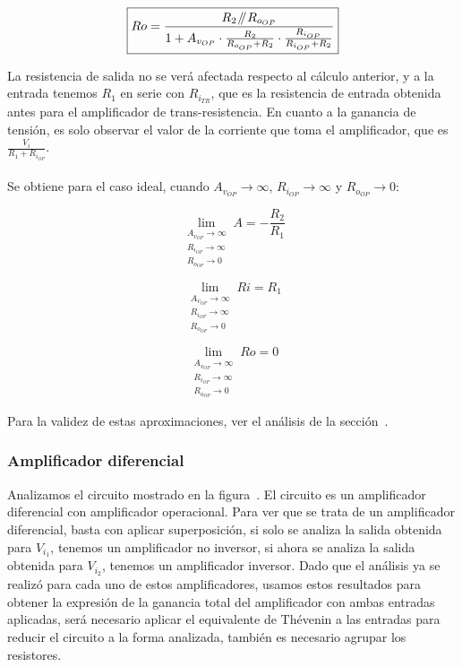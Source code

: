 \begin{equation}
\boxed{ R{o} = \frac{ R_{2} \mathbin{\!/\mkern-5mu/\!} R_{o_{OP}}  }{ 1 + A_{v_{OP}} \cdot \frac{R_{2}}{R_{o_{OP}} + R_{2}} \cdot \frac{R_{i_{OP}}}{R_{i_{OP}} + R_{2}}  }  }
\end{equation}

La resistencia de salida no se verá afectada respecto al cálculo anterior, y a la entrada tenemos $R_{1}$ en serie con $R_{i_{TR}}$, que es la resistencia de entrada obtenida antes para el amplificador de trans-resistencia. En cuanto a la ganancia de tensión, es solo observar el valor de la corriente que toma el amplificador, que es $\frac{V_{i}}{R_{1} + R_{i_{OP}}}$.\\\\

Se obtiene para el caso ideal, cuando $A_{v_{OP}} \longrightarrow \infty$, $R_{i_{OP}} \longrightarrow \infty$ y $R_{o_{OP}} \longrightarrow 0$:

\begin{equation}
\lim_{\substack{A_{v_{OP}} \to \infty \\ R_{i_{OP}} \to \infty \\ R_{o_{OP}} \to 0}} A = - \frac{R_{2}}{R_{1}} 
\end{equation}


\begin{equation}
\lim_{\substack{A_{v_{OP}} \to \infty \\ R_{i_{OP}} \to \infty \\ R_{o_{OP}} \to 0}} R{i} = R_{1}
\end{equation}


\begin{equation}
\lim_{\substack{A_{v_{OP}} \to \infty \\ R_{i_{OP}} \to \infty \\ R_{o_{OP}} \to 0}} R{o} = 0
\end{equation}


Para la validez de estas aproximaciones, ver el análisis de la sección~.

\clearpage


\subsubsection{Amplificador diferencial}

Analizamos el circuito mostrado en la figura~. El circuito es un amplificador diferencial con amplificador operacional. Para ver que se trata de un amplificador diferencial, basta con aplicar superposición, si solo se analiza la salida obtenida para $V_{i_{1}}$, tenemos un amplificador no inversor, si ahora se analiza la salida obtenida para $V_{i_{2}}$, tenemos un amplificador inversor. Dado que el análisis ya se realizó para cada uno de estos amplificadores, usamos estos resultados para obtener la expresión de la ganancia total del amplificador con ambas entradas aplicadas, será necesario aplicar el equivalente de Thévenin a las entradas para reducir el circuito a la forma analizada, también es necesario agrupar los resistores.

